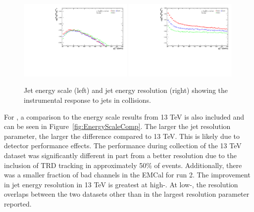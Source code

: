 \begin{figure}[hbt!]
    \centering
    \includegraphics[width=0.49\textwidth]{figures/pPbFigures/EnergyScale/EnergyScaleMean.pdf}
    \includegraphics[width=0.49\textwidth]{figures/pPbFigures/EnergyScale/EnergyScaleWidth.pdf}
    \caption{Jet energy scale (left) and jet energy resolution (right) showing the instrumental response to jets in \pPb collisions.}
    \label{fig:EnergyScalepPb}
\end{figure}

For \pp, a comparison to the energy scale results from 13 TeV is also included and can be seen in Figure~\ref{fig:EnergyScaleComp}. The larger the jet resolution parameter, the larger the difference compared to 13 TeV. This is likely due to detector performance effects. The performance during collection of the 13 TeV dataset was significantly different in part from a better resolution due to the inclusion of TRD tracking in approximately 50\% of events. Additionally, there was a smaller fraction of bad channels in the EMCal for run 2. The improvement in jet energy resolution in 13 TeV is greatest at high-\pT. At low-\pT, the resolution overlaps between the two datasets other than in the largest resolution parameter reported.


